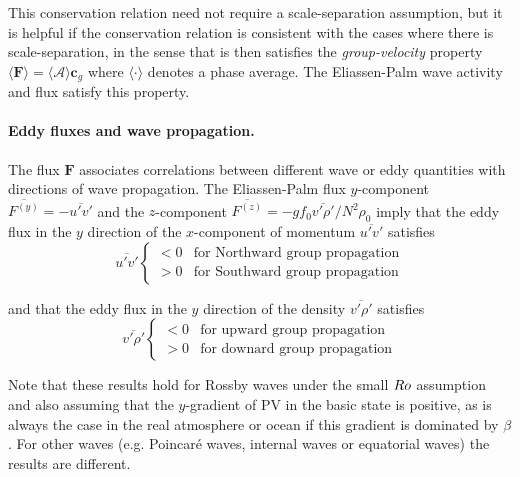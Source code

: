 \documentclass{jknotes}
\begin{document}
This conservation relation
need not require a scale-separation assumption, but it is helpful if the
conservation relation is consistent with the cases where there is
scale-separation, in the sense that is then satisfies the
\emph{group-velocity} property $\langle \symbf{F}\rangle = \langle
\mathcal{A}\rangle \symbf{c}_g$ where $\langle \cdot \rangle$ denotes a phase
average. The Eliassen-Palm wave activity and flux satisfy this property.

\paragraph{Eddy fluxes and wave propagation.} The flux $\symbf{F}$ associates
correlations between different wave or eddy quantities with directions of wave
propagation. The Eliassen-Palm flux $y$-component $\overline{F^{(y)}} =
-\overline{u'v'}$ and the $z$-component $\overline{F^{(z)}} = -g f_0
\overline{v'\rho'}/N^2 \rho_0$ imply that the eddy flux in the $y$ direction
of the $x$-component of momentum $\overline{u'v'}$ satisfies
\begin{equation}
	\overline{u'v'} \begin{cases} < 0 & \text{for Northward group propagation}
		\\ > 0 & \text{for Southward group propagation}\end{cases}
\end{equation}

and that the eddy flux in the $y$ direction of the density
$\overline{v'\rho'}$ satisfies
\begin{equation}
	\overline{v'\rho'} \begin{cases}
		< 0 & \text{for upward group propagation} \\
		> 0 & \text{for downard group propagation}
	\end{cases}
\end{equation}

Note that these results hold for Rossby waves under the small $Ro$ assumption
and also assuming that the $y$-gradient of PV in the basic state is positive,
as is always the case in the real atmosphere or ocean if this gradient is
dominated by $\beta$. For other waves (e.g. Poincar\'{e} waves, internal
waves or equatorial waves) the results are different.
\end{document}
